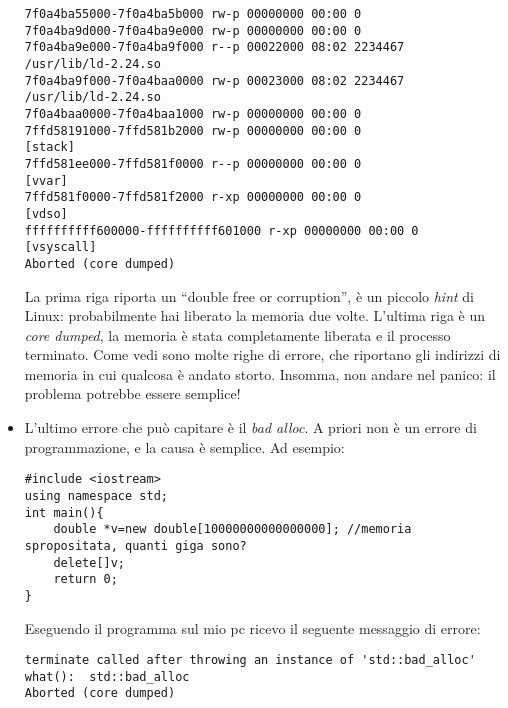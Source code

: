 \begin{itemize}
\begin{tiny}
\begin{shaded}
\begin{verbatim}
7f0a4ba55000-7f0a4ba5b000 rw-p 00000000 00:00 0 
7f0a4ba9d000-7f0a4ba9e000 rw-p 00000000 00:00 0 
7f0a4ba9e000-7f0a4ba9f000 r--p 00022000 08:02 2234467                    /usr/lib/ld-2.24.so
7f0a4ba9f000-7f0a4baa0000 rw-p 00023000 08:02 2234467                    /usr/lib/ld-2.24.so
7f0a4baa0000-7f0a4baa1000 rw-p 00000000 00:00 0 
7ffd58191000-7ffd581b2000 rw-p 00000000 00:00 0                          [stack]
7ffd581ee000-7ffd581f0000 r--p 00000000 00:00 0                          [vvar]
7ffd581f0000-7ffd581f2000 r-xp 00000000 00:00 0                          [vdso]
ffffffffff600000-ffffffffff601000 r-xp 00000000 00:00 0                  [vsyscall]
Aborted (core dumped)

\end{verbatim}
\end{shaded}
\end{tiny}

La prima riga riporta un ``double free or corruption'', è un piccolo \emph{hint} di Linux: probabilmente hai liberato la memoria due volte. L'ultima riga è un \emph{core dumped}, la memoria è stata completamente liberata e il processo terminato. Come vedi sono molte righe di errore, che riportano gli indirizzi di memoria in cui qualcosa è andato storto. Insomma, non andare nel panico: il problema potrebbe essere semplice!

\item L'ultimo errore che può capitare è il \emph{bad alloc}. A priori non è un errore di programmazione, e la causa è semplice. Ad esempio:
\begin{lstlisting}
#include <iostream>
using namespace std;
int main(){
	double *v=new double[10000000000000000]; //memoria spropositata, quanti giga sono?
	delete[]v;
	return 0;
}
\end{lstlisting}

Eseguendo il programma sul mio pc ricevo il seguente messaggio di errore:
\begin{shaded}
	\begin{verbatim}
terminate called after throwing an instance of 'std::bad_alloc'
what():  std::bad_alloc
Aborted (core dumped)
	\end{verbatim}
\end{shaded}


\end{itemize}
